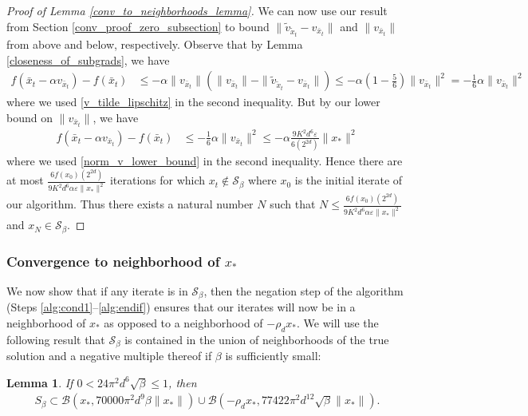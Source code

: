 \documentclass[11pt]{article}
\renewcommand{\epsilon}{\varepsilon}
\newcommand{\al}{\alpha}
\newcommand{\Seps}{\mathcal{S}}
\newtheorem{lem}{Lemma}
\theoremstyle{remark}
\begin{document}
\begin{proof}[Proof of Lemma \ref{conv_to_neighborhoods_lemma}]
We can now use our result from Section \ref{conv_proof_zero_subsection} to bound $\|\tilde{v}_{\tilde{x}_t} - v_{\bar{x}_t}\|$ and $\|v_{\bar{x}_t}\|$ from above and below, respectively. Observe that by Lemma \ref{closeness_of_subgrads}, we have \begin{align*}
    f(\bar{x}_t - \al v_{\bar{x}_t}) - f(\bar{x}_t) &  \leqslant -\al \|v_{\bar{x}_t}\|(\|v_{\bar{x}_t}\|-\|\tilde{v}_{\tilde{x}_t} - v_{\bar{x}_t}\|) \leqslant -\al\left(1 - \frac{5}{6}\right)\|v_{\bar{x}_t}\|^2 = -\frac{1}{6}\al\|v_{\bar{x}_t}\|^2
\end{align*} where we used \eqref{v_tilde_lipschitz} in the second inequality. But by our lower bound on $\|v_{\bar{x}_t}\|$, we have \begin{align*}
    f(\bar{x}_t - \al v_{\bar{x}_t}) - f(\bar{x}_t) & \leqslant -\frac{1}{6}\al\|v_{\bar{x}_t}\|^2 \leqslant -\al \frac{9K^2d^6\epsilon}{6 (2^{2d})}\|x_*\|^2
\end{align*} where we used \eqref{norm_v_lower_bound} in the second inequality. Hence there are at most $\frac{6f(x_0)(2^{2d})}{9K^2d^6 \al \epsilon \|x_*\|^2}$ iterations for which $x_t \notin \Seps_{\beta}$ where $x_0$ is the initial iterate of our algorithm. Thus there exists a natural number $N$ such that $N \leqslant \frac{6f(x_0)(2^{2d})}{9K^2d^6 \al \epsilon \|x_*\|^2}$ and $x_N \in \Seps_{\beta}$.

\end{proof}

\subsubsection{Convergence to neighborhood of $x_*$} \label{conv_proof_second_subsection}

We now show that if any iterate is in $\Seps_{\beta}$, then the negation step of the algorithm (Steps \ref{alg:cond1}--\ref{alg:endif}) ensures that our iterates will now be in a neighborhood of $x_*$ as opposed to a neighborhood of $-\rho_d x_*$. We will use the following result that $\Seps_{\beta}$ is contained in the union of neighborhoods of the true solution and a negative multiple thereof if $\beta$ is sufficiently small:

\begin{lem} \label{Seps_lemma}
If  $0 < 24\pi^2d^6\sqrt{\beta} \leqslant 1$, then \begin{align*}
    S_{\beta} \subset \mathcal{B}(x_*,70000\pi^2 d^9\beta\|x_*\|) \cup \mathcal{B}(-\rho_d x_*, 77422\pi^2d^{12}\sqrt{\beta}\|x_*\|).
 \end{align*}
\end{lem}
\end{document}

